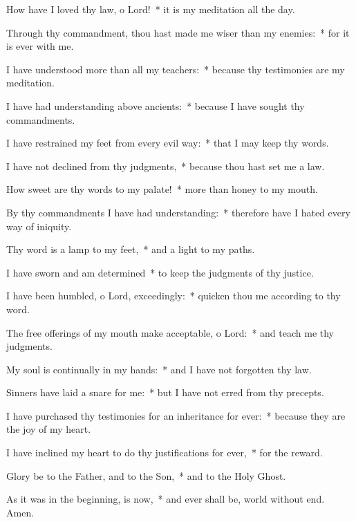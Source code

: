 \begin{enpars}
\item How have I loved thy law, o Lord!~* it is my meditation all the day.
\item Through thy commandment, thou hast made me wiser than my enemies:~* for it is ever with me.
\item I have understood more than all my teachers:~* because thy testimonies are my meditation.
\item I have had understanding above ancients:~* because I have sought thy commandments.
\item I have restrained my feet from every evil way:~* that I may keep thy words.
\item I have not declined from thy judgments,~* because thou hast set me a law.
\item How sweet are thy words to my palate!~* more than honey to my mouth.
\item By thy commandments I have had understanding:~* therefore have I hated every way of iniquity.
\item Thy word is a lamp to my feet,~* and a light to my paths.
\item I have sworn and am determined~* to keep the judgments of thy justice.
\item I have been humbled, o Lord, exceedingly:~* quicken thou me according to thy word.
\item The free offerings of my mouth make acceptable, o Lord:~* and teach me thy judgments.
\item My soul is continually in my hands:~* and I have not forgotten thy law.
\item Sinners have laid a snare for me:~* but I have not erred from thy precepts.
\item I have purchased thy testimonies for an inheritance for ever:~* because they are the joy of my heart.
\item I have inclined my heart to do thy justifications for ever,~* for the reward.
\item Glory be to the Father, and to the Son,~* and to the Holy Ghost.
\item As it was in the beginning, is now,~* and ever shall be, world without end. Amen.
\end{enpars}